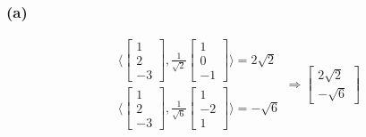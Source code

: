 \documentclass{article}
\begin{document}
\subsubsection*{(a)}
\begin{equation*}
    \begin{split}
        & \langle \begin{bmatrix}
            1 \\ 2 \\ -3
        \end{bmatrix}, \frac{1}{ \sqrt{2}} \begin{bmatrix}
            1 \\ 0 \\ -1
        \end{bmatrix} \rangle = 2 \sqrt{2} \\
        & \langle \begin{bmatrix}
            1 \\ 2 \\ -3
        \end{bmatrix}, \frac{1}{ \sqrt{6}} \begin{bmatrix}
            1 \\ -2 \\ 1
        \end{bmatrix} \rangle = - \sqrt{6}
    \end{split}
    \Rightarrow \begin{bmatrix}
        2 \sqrt{2} \\ - \sqrt{6}
    \end{bmatrix}
\end{equation*}
\end{document}
